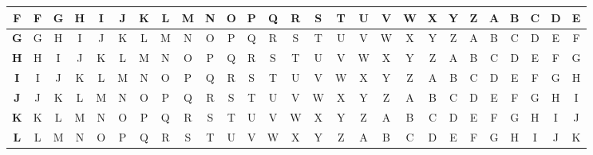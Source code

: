\begin{table}[H]
\begin{tabular}{|c||c|c|c|c|c|c|c|c|c|c|c|c|c|c|c|c|c|c|c|c|c|c|c|c|c|c|}
							\textbf{F} & F          & G          & H          & I          & J          & K          & L          & M          & N          & O          & P          & Q          & R          & S          & T          & U          & V          & W          & X          & Y          & Z          & A          & B          & C          & D          & E          \\ \hline
							\textbf{G} & G          & H          & I          & J          & K          & L          & M          & N          & O          & P          & Q          & R          & S          & T          & U          & V          & W          & X          & Y          & Z          & A          & B          & C          & D          & E          & F          \\ \hline
							\textbf{H} & H          & I          & J          & K          & L          & M          & N          & O          & P          & Q          & R          & S          & T          & U          & V          & W          & X          & Y          & Z          & A          & B          & C          & D          & E          & F          & G          \\ \hline
							\textbf{I} & I          & J          & K          & L          & M          & N          & O          & P          & Q          & R          & S          & T          & U          & V          & W          & X          & Y          & Z          & A          & B          & C          & D          & E          & F          & G          & H          \\ \hline
							\textbf{J} & J          & K          & L          & M          & N          & O          & P          & Q          & R          & S          & T          & U          & V          & W          & X          & Y          & Z          & A          & B          & C          & D          & E          & F          & G          & H          & I          \\ \hline
							\textbf{K} & K          & L          & M          & N          & O          & P          & Q          & R          & S          & T          & U          & V          & W          & X          & Y          & Z          & A          & B          & C          & D          & E          & F          & G          & H          & I          & J          \\ \hline
							\textbf{L} & L          & M          & N          & O          & P          & Q          & R          & S          & T          & U          & V          & W          & X          & Y          & Z          & A          & B          & C          & D          & E          & F          & G          & H          & I          & J          & K          \\ \hline

\end{tabular}
\end{table}
